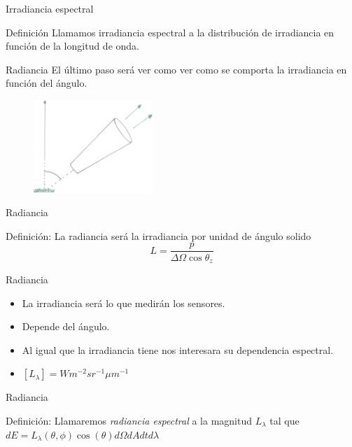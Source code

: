 \documentclass[handout]{beamer}
\begin{document}
\begin{frame}{Irradiancia espectral}
  \begin{block}{Definición}
    Llamamos irradiancia espectral a la distribución de irradiancia en función de la longitud de onda.
  \end{block}
\end{frame}

\begin{frame}{Radiancia}
  El último paso será ver como ver como se comporta la irradiancia en función del ángulo.
  \begin{figure}
    \includegraphics[width=0.4\textwidth]{imagenes/radiancia.png}
  \end{figure}
\end{frame}

\begin{frame}{Radiancia}
  \begin{block}{Definición}:
    La radiancia será la irradiancia por unidad de ángulo solido
    \begin{equation}
      L = \frac{p}{\Delta \Omega \cos\theta_z}
    \end{equation}
  \end{block}
\end{frame}

\begin{frame}{Radiancia}
  \begin{itemize}[<+>]
    \item La irradiancia será lo que medirán los sensores.
    \item Depende del ángulo.
    \item Al igual que la irradiancia tiene nos interesara su dependencia espectral.
    \item $[L_\lambda] = W m^{-2} sr^{-1} \mu m^{-1}$
  \end{itemize}
\end{frame}

\begin{frame}{Radiancia}
  \begin{block}{Definición:}
    Llamaremos \emph{radiancia espectral} a la magnitud $L_\lambda$ tal que
    $dE = L_{\lambda}(\theta,\phi) \cos(\theta) d\Omega dA dt d\lambda$
  \end{block}
\end{frame}
\end{document}
